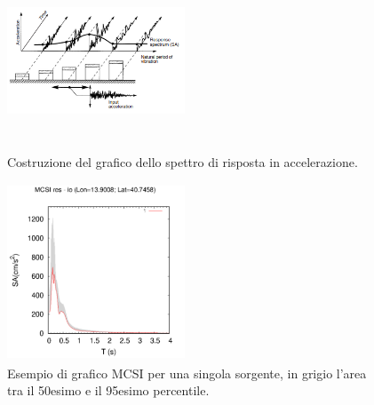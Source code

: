 \documentclass[a4paper,12pt,titlepage]{article}
\begin{document}
\begin{figure}[htbp]%
 \centering
 \includegraphics[width = 150pt, height =150pt]{Img/oscillatori.png}
 \caption{Costruzione del grafico dello spettro di risposta in accelerazione.}
 \label{fig:oscillatori}
\end{figure}

\begin{figure}[htbp]%
 \centering
 \includegraphics[width = 150pt, height =150pt]{Img/MCSI.png}
 \caption{Esempio di grafico MCSI per una singola sorgente, in grigio l'area tra il 50esimo e il 95esimo percentile.}
 \label{fig:MCSI}
\end{figure}
\end{document}
